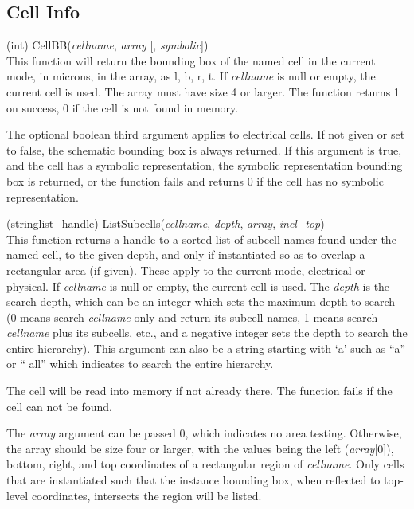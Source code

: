 \subsection{Cell Info}

\begin{description}
\item{(int) \vt CellBB({\it cellname\/}, {\it array\/} [, {\it symbolic\/}])}\\
This function will return the bounding box of the named cell in the
current mode, in microns, in the array, as l, b, r, t.  If {\it
cellname} is null or empty, the current cell is used.  The array must
have size 4 or larger.  The function returns 1 on success, 0 if the
cell is not found in memory.

The optional boolean third argument applies to electrical cells.  If
not given or set to false, the schematic bounding box is always
returned.  If this argument is true, and the cell has a symbolic
representation, the symbolic representation bounding box is returned,
or the function fails and returns 0 if the cell has no symbolic
representation.

\item{(stringlist\_handle) \vt ListSubcells({\it cellname\/}, {\it depth\/},
 {\it array\/}, {\it incl\_top\/})}\\
This function returns a handle to a sorted list of subcell names found
under the named cell, to the given depth, and only if instantiated so
as to overlap a rectangular area (if given).  These apply to the
current mode, electrical or physical.  If {\it cellname} is null or
empty, the current cell is used.  The {\it depth} is the search depth,
which can be an integer which sets the maximum depth to search (0
means search {\it cellname} only and return its subcell names, 1 means
search {\it cellname} plus its subcells, etc., and a negative integer
sets the depth to search the entire hierarchy).  This argument can
also be a string starting with `{\vt a}' such as ``{\vt a}'' or ``{\vt
all}'' which indicates to search the entire hierarchy.

The cell will be read into memory if not already there.  The function
fails if the cell can not be found.

The {\it array} argument can be passed 0, which indicates no area
testing.  Otherwise, the array should be size four or larger, with the
values being the left ({\it array\/}[0]), bottom, right, and top
coordinates of a rectangular region of {\it cellname}.  Only cells
that are instantiated such that the instance bounding box, when
reflected to top-level coordinates, intersects the region will be
listed.


\end{description}
